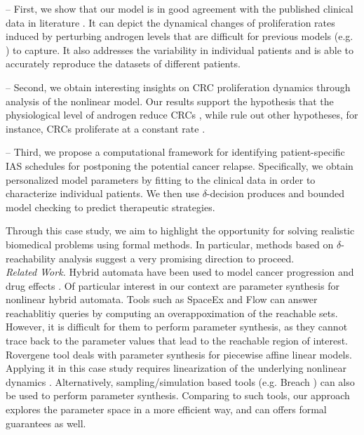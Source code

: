-- First, we show that our model is in good agreement with the published clinical data in literature \cite{ bruchovsky06,bruchovsky07}. It can depict the dynamical changes of proliferation rates induced by perturbing androgen levels that are difficult for previous models (e.g. \cite{ideta08}) to capture. It also addresses the variability in individual patients and is able to accurately reproduce the datasets of different patients.  

-- Second, we obtain interesting insights on CRC proliferation dynamics through analysis of the nonlinear model. Our results support the hypothesis that the physiological level of androgen reduce CRCs \cite{ideta08}, while rule out other hypotheses, for instance, CRCs proliferate at a constant rate \cite{portz12}. 

-- Third, we propose a computational framework for identifying patient-specific IAS schedules for postponing the potential cancer relapse. Specifically, we obtain personalized model parameters by fitting to the clinical data in order to characterize individual patients. We then use $\delta$-decision produces and bounded model checking to predict therapeutic strategies. 

Through this case study, we aim to highlight the opportunity for solving realistic biomedical problems using formal methods. In particular, methods based on $\delta$-reachability analysis suggest a very promising direction to proceed. \\ 



\noindent \textit{Related Work.} Hybrid automata have been used to model cancer progression and drug effects \cite{bud14}. Of particular interest in our context are parameter synthesis for nonlinear hybrid automata. Tools such as SpaceEx \cite{spaceex} and Flow\* \cite{flowstar} can answer reachablitiy queries by computing an overappoximation of the reachable sets. However, it is difficult for them to perform parameter synthesis, as they cannot trace back to the parameter values that lead to the reachable region of interest. Rovergene tool \cite{rovergene} deals with parameter synthesis for piecewise affine linear models. Applying it in this case study requires linearization of the underlying nonlinear dynamics \cite{grosu11}. Alternatively, sampling/simulation based tools (e.g. Breach \cite{breach}) can also be used to perform parameter synthesis. Comparing to such tools, our approach explores the parameter space in a more efficient way, and can offers formal guarantees as well.

